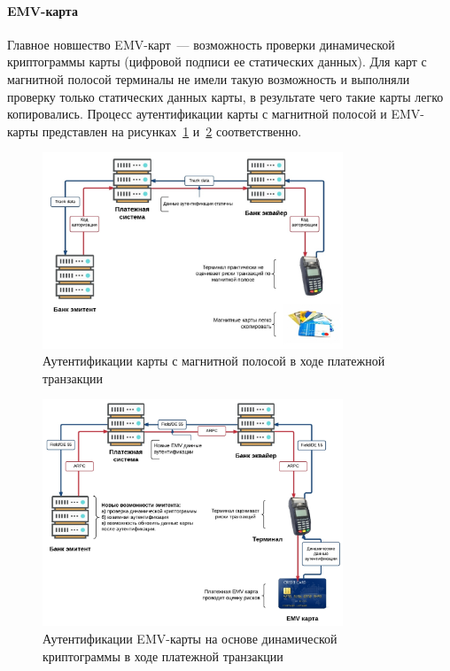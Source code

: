 \paragraph{EMV-карта}

Главное новшество EMV-карт~--- возможность проверки динамической криптограммы карты (цифровой подписи ее статических данных).
Для карт с магнитной полосой терминалы не имели такую возможность и выполняли проверку только статических данных карты, в результате чего такие карты легко копировались.
Процесс аутентификации карты с магнитной полосой и EMV-карты представлен на рисунках~\ref{fig:magnetic_card_auth} и~\ref{fig:emv_card_auth} соответственно.

\begin{figure}[H]
    \centering
    \includegraphics[width=0.8\textwidth]{images/research/magnetic_card_auth}
    \caption{\centering Аутентификации карты с магнитной полосой в ходе платежной транзакции}
    \label{fig:magnetic_card_auth}
\end{figure}

\begin{figure}[H]
    \centering
    \includegraphics[width=0.8\textwidth]{images/research/emv_card_auth}
    \caption{\centering Аутентификации EMV-карты на основе динамической криптограммы в ходе платежной транзакции}
    \label{fig:emv_card_auth}
\end{figure}

